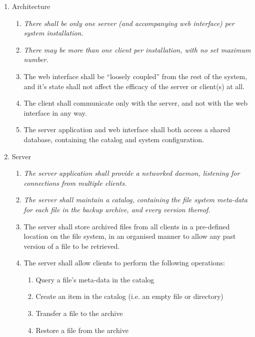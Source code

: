 \begin{enumerate}
    \item Architecture
        \begin{enumerate}
            \item \emph{There shall be only one server (and accompanying web
                interface) per system installation.}
            \item \emph{There may be more than one client per installation,
                with no set maximum number.}
            \item The web interface shall be ``loosely coupled'' from the rest
                of the system, and it's state shall not affect the efficacy of
                the server or client(s) at all.
            \item The client shall communicate only with the server, and not
                with the web interface in any way.
            \item The server application and web interface shall both access
                a shared database, containing the catalog and system
                configuration.
        \end{enumerate}
    \item Server
        \begin{enumerate}
            \item \emph{The server application shall provide a networked
                daemon, listening for connections from multiple clients.}
            \item \emph{The server shall maintain a catalog, containing the
                file system meta-data for each file in the backup archive, and
                every version thereof.}
            \item The server shall store archived files from all clients in
                a pre-defined location on the file system, in an organised
                manner to allow any past version of a file to be retrieved.
            \item The server shall allow clients to perform the following
                operations:
                \begin{enumerate}
                    \item Query a file's meta-data in the catalog
                    \item Create an item in the catalog (i.e. an empty file or
                        directory)
                    \item Transfer a file to the archive
                    \item Restore a file from the archive

\end{enumerate}
\end{enumerate}
\end{enumerate}
